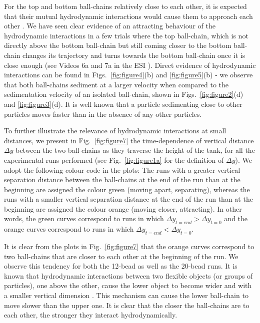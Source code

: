 \documentclass{article}
\begin{document}
For the top and bottom ball-chains relatively close to each other, it is expected that their mutual hydrodynamic interactions would cause them to approach each other \cite{saggiorato2015conformations}.
We have seen clear evidence of an attracting behaviour of the hydrodynamic interactions in a few trials where the top ball-chain, which is not directly above the bottom ball-chain but still coming closer to the bottom ball-chain changes its trajectory and turns towards the bottom ball-chain once it is close enough (see Videos 6a and 7a in the ESI\dag{} 
). %
Direct evidence of hydrodynamic interactions can be found in Figs.~\ref{fig:figure4}(b) and \ref{fig:figure5}(b) - we observe that both ball-chains sediment at a larger velocity when compared to the sedimentation velocity of an isolated ball-chain,  shown in Figs.~\ref{fig:figure2}(d) and \ref{fig:figure3}(d). It is well known %
that a particle  %
sedimenting close to other particles
moves %
faster than in the absence of any other particles. %


To further illustrate the relevance of hydrodynamic interactions at small distances, we present in Fig.~\ref{fig:figure7} the %
time-dependence of vertical distance $\Delta y$ between the two ball-chains as they traverse the height of the tank, for all the experimental runs performed (see Fig.~\ref{fig:figure1a} for the definition of $\Delta y$). 
We adopt the following colour code in the plots: The runs with a greater vertical separation distance between the ball-chains at the end of the run than at the beginning are assigned the colour green (moving apart, separating), whereas the runs with a smaller vertical separation distance at the end of the run than at the beginning are assigned the colour orange (moving closer, attracting). 
In other words, the green curves correspond to runs in which $\Delta y_{t=end} > \Delta y_{t=0}$ and the orange curves correspond to runs in which $\Delta y_{t=end} < \Delta y_{t=0}$. 

It is clear from the plots in Fig.~\ref{fig:figure7} that the orange curves correspond to two ball-chains that are closer to each other  at the beginning of the run.
We observe this tendency for both the 12-bead as well as the 20-bead runs. 
It is known that hydrodynamic interactions between two flexible objects (or groups of particles), one above the other, cause the lower object to become wider and with a smaller vertical dimension \cite{ekiel2014,saggiorato2015conformations}. %
This mechanism can cause the lower ball-chain to move slower than the upper one. 
It is clear that %
the closer the ball-chains are to each other, the stronger they interact hydrodynamically. %
\end{document}
